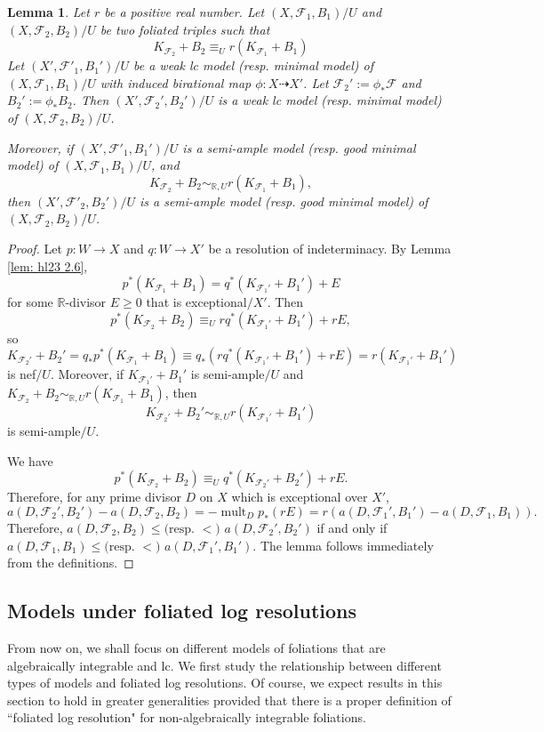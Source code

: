 \documentclass[11pt]{amsart}
\numberwithin{equation}{section}
\newcommand{\Rr}{\mathbb{R}}
\newcommand{\mult}{\operatorname{mult}}
\newcommand{\Ff}{\mathcal{F}}
\newtheorem{lem}[thm]{Lemma}
\theoremstyle{definition}
\theoremstyle{definition}
\theoremstyle{definition}
\begin{document}
\begin{lem}\label{lem: numerical equivalence model}
    Let $r$ be a positive real number. Let $(X,\Ff_1,B_1)/U$ and $(X,\Ff_2,B_2)/U$ be two foliated triples such that
    $$K_{\Ff_2}+B_2\equiv_U r(K_{\Ff_1}+B_1)$$
    Let $(X',\Ff'_1,B_1')/U$ be a weak lc model (resp. minimal model) of $(X,\Ff_1,B_1)/U$ with induced birational map $\phi: X\dashrightarrow X'$. Let $\Ff_2':=\phi_*\Ff$ and $B_2':=\phi_*B_2$. Then $(X',\Ff_2',B_2')/U$ is a weak lc model (resp. minimal model) of $(X,\Ff_2,B_2)/U$.

    Moreover, if  $(X',\Ff'_1,B_1')/U$ is a semi-ample model (resp. good minimal model) of $(X,\Ff_1,B_1)/U$, and
    $$K_{\Ff_2}+B_2\sim_{\mathbb R,U} r(K_{\Ff_1}+B_1),$$
        then $(X',\Ff'_2,B_2')/U$ is a semi-ample model (resp. good minimal model) of $(X,\Ff_2,B_2)/U$.
\end{lem}
\begin{proof}
Let $p: W\rightarrow X$ and $q: W\rightarrow X'$ be a resolution of indeterminacy. By Lemma \ref{lem: hl23 2.6},
$$p^*(K_{\Ff_1}+B_1)=q^*(K_{\Ff_1'}+B_1')+E$$
for some $\Rr$-divisor $E\geq 0$ that is exceptional$/X'$. Then
$$p^*(K_{\Ff_2}+B_2)\equiv_U rq^*(K_{\Ff_1'}+B_1')+rE,$$
so
$$K_{\Ff_2'}+B_2'=q_*p^*(K_{\Ff_1}+B_1)\equiv q_*(rq^*(K_{\Ff_1'}+B_1')+rE)=r(K_{\Ff_1'}+B_1')$$
is nef$/U$. Moreover, if $K_{\Ff_1'}+B_1'$ is semi-ample$/U$ and $K_{\Ff_2}+B_2\sim_{\mathbb R,U} r(K_{\Ff_1}+B_1)$, then 
$$K_{\Ff_2'}+B_2'\sim_{\mathbb R,U}r(K_{\Ff_1'}+B_1')$$
is semi-ample$/U$. 

We have
$$p^*(K_{\Ff_2}+B_2)\equiv_U q^*(K_{\Ff_2'}+B_2')+rE.$$
Therefore, for any prime divisor $D$ on $X$ which is exceptional over $X'$,
$$a(D,\Ff_2',B_2')-a(D,\Ff_2,B_2)=-\mult_Dp_*(rE)=r(a(D,\Ff_1',B_1')-a(D,\Ff_1,B_1)).$$
Therefore, 
$a(D,\Ff_2,B_2)\leq\text{(resp. }<\text{) }a(D,\Ff_2',B_2')$ if and only if $a(D,\Ff_1,B_1)\leq\text{(resp. }<\text{) }a(D,\Ff_1',B_1')$. The lemma follows immediately from the definitions.
\end{proof}

\subsection{Models under foliated log resolutions}

From now on, we shall focus on different models of foliations that are algebraically integrable and lc. We first study the relationship between different types of models and foliated log resolutions. Of course, we expect results in this section to hold in greater generalities provided that there is a proper definition of ``foliated log resolution" for non-algebraically integrable foliations.
\end{document}
